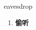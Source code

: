 
\begin{frame}
{\huge eavesdrop}
\begin{center}
\begin{enumerate}\Large
  \item \textbf{偷听}
\end{enumerate}
\end{center}
\end{frame}
